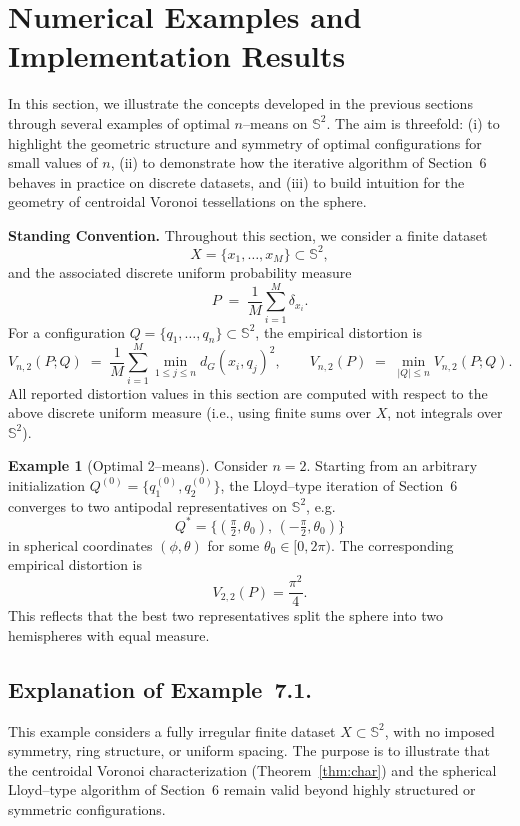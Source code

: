 \documentclass[12pt, reqno]{amsart}
\theoremstyle{plain}
\theoremstyle{definition}
\newtheorem{exam}[subsection]{Example}
\newcommand{\D}[1]{\mathbb{#1}}%
\begin{document}
 \section{Numerical Examples and Implementation Results} \label{sec7}

In this section, we illustrate the concepts developed in the previous sections through several examples of optimal $n$--means on $\mathbb{S}^2$. The aim is threefold: 
(i) to highlight the geometric structure and symmetry of optimal configurations for small values of $n$, 
(ii) to demonstrate how the iterative algorithm of Section~6 behaves in practice on discrete datasets, 
and (iii) to build intuition for the geometry of centroidal Voronoi tessellations on the sphere.

\medskip
\noindent\textbf{Standing Convention.}
Throughout this section, we consider a finite dataset 
\[
X=\{x_1,\dots,x_M\}\subset\mathbb{S}^2,
\]
and the associated discrete uniform probability measure
\[
P \;=\; \frac{1}{M}\sum_{i=1}^{M} \delta_{x_i}.
\]
For a configuration $Q=\{q_1,\dots,q_n\}\subset\mathbb{S}^2$, the empirical distortion is
\[
V_{n,2}(P;Q)
\;=\;
\frac{1}{M}\sum_{i=1}^{M} \min_{1\le j\le n} d_G(x_i,q_j)^2,
\qquad
V_{n,2}(P) \;=\; \min_{|Q|\le n} V_{n,2}(P;Q).
\]
All reported distortion values in this section are computed with respect to the above discrete uniform measure (i.e., using finite sums over $X$, not integrals over $\mathbb{S}^2$).

\begin{exam}[Optimal 2--means]\label{ex:2means}
Consider $n=2$. Starting from an arbitrary initialization $Q^{(0)}=\{q^{(0)}_1,q^{(0)}_2\}$, the Lloyd--type iteration of Section~6 converges to two antipodal representatives on $\mathbb{S}^2$, e.g.\ 
\[
Q^*=\bigl\{(\tfrac{\pi}{2},\theta_0),\,(-\tfrac{\pi}{2},\theta_0)\bigr\}
\]
in spherical coordinates $(\phi,\theta)$ for some $\theta_0\in[0,2\pi)$. 
The corresponding empirical distortion is
\[
V_{2,2}(P)=\frac{\pi^2}{4}.
\]
This reflects that the best two representatives split the sphere into two hemispheres with equal measure.
\end{exam}
\subsection*{Explanation of Example~7.1.}
This example considers a fully irregular finite dataset \(X \subset \D S^2\),
with no imposed symmetry, ring structure, or uniform spacing.
The purpose is to illustrate that the centroidal Voronoi characterization
(Theorem~\ref{thm:char}) and the spherical Lloyd--type algorithm of Section~6
remain valid beyond highly structured or symmetric configurations.
\end{document}

